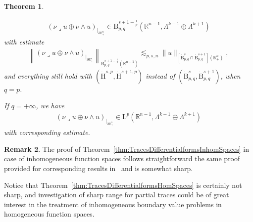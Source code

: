 \documentclass[10pt]{amsart}
\newtheorem{theo}{Theorem}[section]
\theoremstyle{definition}\newtheorem{defi}[theo]{Definition}\newtheorem{rema}[theo]{Remark}\newtheorem{exam}[theo]{Example}\newtheorem{exem}[theo]{Example}\newtheorem{nota}[theo]{Notation}
\newcommand{\bbR}{\mathbb{R}}
\newcommand{\rmH}{\mathrm{H}}%
\newcommand{\rmB}{\mathrm{B}}
\newcommand{\rmL}{\mathrm{L}}
\newcommand{\iprod}{\mathbin{\lrcorner}}
\begin{document}
\begin{theo}
\begin{enumerate}
\begin{align*}
\left(\nu\iprod u\oplus\nu\wedge u\right)_{|_{\partial\bbR^n_+}}\in \rmB^{s+1-\frac{1}{p}}_{p,q} \left(\bbR^{n-1},\Lambda^{k-1}\oplus\Lambda^{k+1}\right)
\end{align*}
with estimate
\begin{align*}
\left\| \left(\nu\iprod u\oplus\nu\wedge u\right)_{|_{\partial\bbR^n_+}} \right\|_{\rmB^{s+1-\frac{1}{p}}_{p,q}\left(\bbR^{n-1}\right)} \lesssim_{p,s,n} \| u \|_{\left[{\dot{\rmB}}^{s}_{p,q}\cap{\dot{\rmB}}^{s+1}_{p,q}\right]\left(\bbR^n_+\right)},
\end{align*}
and everything still hold with $({\dot{\rmH}}^{s,p},{\dot{\rmH}}^{s+1,p})$ instead of $(\dot{\rmB}^{s}_{p,q},\dot{\rmB}^{s+1}_{p,q})$, when $q=p$.

If $q=+\infty$, we have
\begin{align*}
(\nu\iprod u\oplus\nu\wedge u)_{|_{\partial\bbR^n_+}}\in \rmL^{p} \left(\bbR^{n-1},\Lambda^{k-1}\oplus\Lambda^{k+1}\right)
\end{align*}
with corresponding estimate.
\end{enumerate}
\end{theo}

\begin{rema}
The proof of Theorem~\ref{thm:TracesDifferentialformsInhomSpaces} in case of inhomogeneous function spaces follows straightforward the same proof provided for corresponding results in~\cite[Section~4]{MitreaMitreaShaw2008} and is somewhat sharp.

Notice that Theorem~\ref{thm:TracesDifferentialformsHomSpaces} is certainly not sharp, and investigation of sharp range for partial traces could be of great interest in the treatment of inhomogeneous boundary value problems in homogeneous function spaces.
\end{rema}
\end{document}
